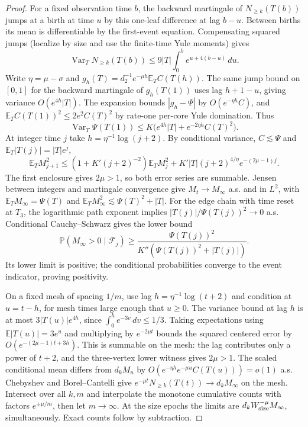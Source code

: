 \documentclass[11pt]{article}
\theoremstyle{remark}
\numberwithin{equation}{section}
\newcommand{\E}{\mathbb E}
\begin{document}
\begin{proof}
For a fixed observation time $b$, the backward martingale of $N_{\ge k}(T(b))$ jumps at a birth at time $u$ by this one-leaf difference at lag $b-u$. Between births its mean is differentiable by the first-event equation. Compensating squared jumps (localize by size and use the finite-time Yule moments) gives
\[
 \operatorname{Var}_T N_{\ge k}(T(b))\le9|T|\int_0^b e^{u+4(b-u)}\,du.
\]
Write $\eta=\mu-\sigma$ and $g_h(T)=d_2^{-1}e^{-\mu h}\mathbb E_T C(T(h))$. The same jump bound on $[0,1]$ for the backward martingale of $g_h(T(1))$ uses lag $h+1-u$, giving variance $O(e^{4h}|T|)$. The expansion bounds $|g_h-\Psi|$ by $O(e^{-\eta h}C)$, and $\mathbb E_T C(T(1))^2\le2e^2 C(T)^2$ by rate-one per-core Yule domination. Thus
\[
 \operatorname{Var}_T\Psi(T(1))\le K\big(e^{4h}|T|+e^{-2\eta h}C(T)^2\big).
\]
At integer time $j$ take $h=\eta^{-1}\log(j+2)$. By conditional variance, $C\lesssim\Psi$ and $\mathbb E_T|T(j)|=|T|e^j$,
\[
 \mathbb E_T M_{j+1}^2\le(1+K'(j+2)^{-2})\mathbb E_T M_j^2
 +K' |T|(j+2)^{4/\eta}e^{-(2\mu-1)j}.
\]
The first enclosure gives $2\mu>1$, so both error series are summable. Jensen between integers and martingale convergence give $M_t\to M_\infty$ a.s. and in $L^2$, with $\mathbb E_T M_\infty=\Psi(T)$ and $\mathbb E_T M_\infty^2\lesssim\Psi(T)^2+|T|$. For the edge chain with time reset at $T_3$, the logarithmic path exponent implies $|T(j)|/\Psi(T(j))^2\to0$ a.s. Conditional Cauchy--Schwarz gives the lower bound
\[
 \mathbb P(M_\infty>0\mid\mathcal F_j)\ge
 \frac{\Psi(T(j))^2}{K''(\Psi(T(j))^2+|T(j)|)}.
\]
Its lower limit is positive; the conditional probabilities converge to the event indicator, proving positivity.

On a fixed mesh of spacing $1/m$, use lag $h=\eta^{-1}\log(t+2)$ and condition at $u=t-h$, for mesh times large enough that $u\ge0$. The variance bound at lag $h$ is at most $3|T(u)|e^{4h}$, since $\int_0^h e^{-3v}\,dv\le1/3$. Taking expectations using $\E |T(u)|=3e^u$ and multiplying by $e^{-2\mu t}$ bounds the squared centered error by $O(e^{-(2\mu-1)t+3h})$. This is summable on the mesh: the lag contributes only a power of $t+2$, and the three-vertex lower witness gives $2\mu>1$. The scaled conditional mean differs from $d_k M_u$ by $O(e^{-\eta h}e^{-\mu u}C(T(u)))=o(1)$ a.s. Chebyshev and Borel--Cantelli give $e^{-\mu t}N_{\ge k}(T(t))\to d_k M_\infty$ on the mesh. Intersect over all $k,m$ and interpolate the monotone cumulative counts with factors $e^{\pm\mu/m}$, then let $m\to\infty$. At the size epochs the limits are $d_k W_{\rm size}^{-\mu}M_\infty$, simultaneously. Exact counts follow by subtraction.


\end{proof}
\end{document}

